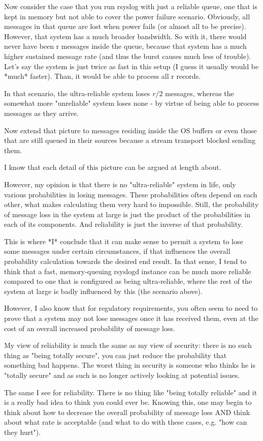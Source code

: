 \documentclass[a4paper,10pt]{article}
\begin{document}
Now consider the case that you run rsyslog with just a reliable queue, one that is kept in memory but not able to cover the power failure scenario. Obviously, all messages in that queue are lost when power fails (or almost all to be precise). However, that system has a much broader bandwidth. So with it, there would never have been r messages inside the queue, because that system has a much higher sustained message rate (and thus the burst causes much less of trouble). Let's say the system is just twice as fast in this setup (I guess it usually would be *much* faster). Than, it would be able to process all r records.

In that scenario, the ultra-reliable system loses $r/2$ messages, whereas the somewhat more "unreliable" system loses none - by virtue of being able to process messages as they arrive. 

Now extend that picture to messages residing inside the OS buffers or even those that are still queued in their sources because a stream transport blocked sending them.

I know that each detail of this picture can be argued at length about.

However, my opinion is that there is no "ultra-reliable" system in life, only various probabilities in losing messages. These probabilities  often depend on each other, what makes calculating them very hard to impossible. Still, the probability of message loss in the system at large is just the product of the probabilities in each of its  components. And reliability is just the inverse of that probability.

This is where *I* conclude that it can make sense to permit a system to lose some messages under certain circumstances, if that influences the overall probability calculation towards the desired end result. In that sense, I tend to think that a fast, memory-queuing rsyslogd instance can be much more reliable compared to one that is configured as being ultra-reliable, where the rest of the system at large is badly influenced by this (the scenario above).

However, I also know that for regulatory requirements, you often seem to need to prove that a system may not lose messages once it has received them, even at the cost of an overall increased probability of message loss.

My view of reliability is much the same as my view of security: there is no such thing as "being totally secure", you can just reduce the probability that something bad happens. The worst thing in security is someone who thinks he is "totally secure" and as such is no longer actively looking at potential issues.

The same I see for reliability. There is no thing like "being totally reliable" and it is a really bad idea to think you could ever be. Knowing this, one may begin to think about how to decrease the overall probability of message loss AND think about what rate is acceptable (and what to do with these cases, e.g. "how can they hurt").
\end{document}
